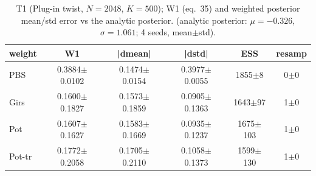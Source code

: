 \begin{table}[ht]
\centering
\caption{T1 (Plug-in twist, $N=2048$, $K=500$); W1 (eq.~35) and weighted posterior mean/std error vs the analytic posterior. (analytic posterior: $\mu=-0.326$, $\sigma=1.061$; 4 seeds, mean$\pm$std).}
\label{tab:toy_t1_plug_in}
\begin{tabular}{lccccc}
\toprule
weight & W1 & |dmean| & |dstd| & ESS & resamp \\
\midrule
PBS & 0.3884$\pm$0.0102 & 0.1474$\pm$0.0154 & 0.3977$\pm$0.0055 & 1855$\pm$8 & 0$\pm$0 \\
Girs & 0.1600$\pm$0.1827 & 0.1573$\pm$0.1859 & 0.0905$\pm$0.1363 & 1643$\pm$97 & 1$\pm$0 \\
Pot & 0.1607$\pm$0.1627 & 0.1583$\pm$0.1669 & 0.0935$\pm$0.1237 & 1675$\pm$103 & 1$\pm$0 \\
Pot-tr & 0.1772$\pm$0.2058 & 0.1705$\pm$0.2110 & 0.1058$\pm$0.1373 & 1599$\pm$130 & 1$\pm$0 \\
\bottomrule
\end{tabular}
\end{table}
